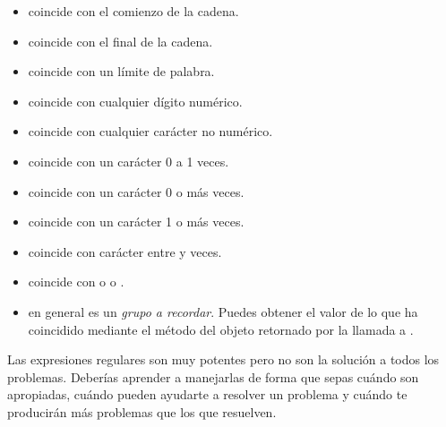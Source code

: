 \begin{itemize}
\item \codigo{$\backslash$\^} coincide con el comienzo de la cadena.
\item \codigo{$\backslash\$$} coincide con el final de la cadena.
\item {} coincide con un límite de palabra.
\item {} coincide con cualquier dígito numérico.
\item {} coincide con cualquier carácter no numérico.
\item {} coincide con un carácter  0 a 1 veces.
\item {} coincide con un carácter  0 o más veces.
\item {} coincide con un carácter  1 o más veces.
\item {} coincide con carácter  entre  y  veces.
\item {} coincide con  o  o .
\item {} en general es un \emph{grupo a recordar}. Puedes obtener el valor de lo que ha coincidido mediante el método  del objeto retornado por la llamada a .
\end{itemize}

Las expresiones regulares son muy potentes pero no son la solución a todos los problemas. Deberías aprender a manejarlas de forma que sepas cuándo son apropiadas, cuándo pueden ayudarte a resolver un problema y cuándo te producirán más problemas que los que resuelven.

